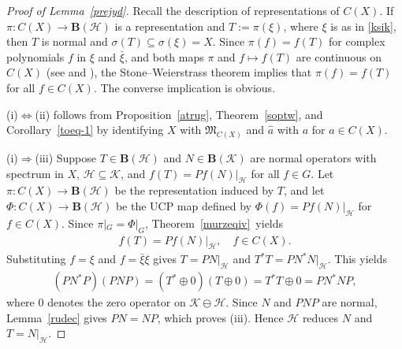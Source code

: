 \documentclass[reqno]{amsproc}
\numberwithin{equation}{section}
\theoremstyle{remark}
\newcommand*{\hh}{\mathcal{H}}
\newcommand*{\kk}{\mathcal{K}}
\theoremstyle{definition}
\newcommand*{\ogr}{\boldsymbol{B}}
\begin{document}
   \begin{proof}[Proof of Lemma~\ref{prejyd}]
Recall the description of representations of $C(X)$.
If $\pi\colon C(X) \to \ogr(\hh)$ is a representation
and $T:= \pi(\xi)$, where $\xi$ is as in \eqref{ksik},
then $T$ is normal and $\sigma(T) \subseteq
\sigma(\xi) = X$. Since $\pi(f)=f(T)$ for complex
polynomials $f$ in $\xi$ and $\bar \xi$, and both maps
$\pi$ and $f\mapsto f(T)$ are continuous on $C(X)$
(see \cite[Theorem~2.1.7]{Mur90} and
\cite[\S12.24]{Rud73}), the Stone--Weierstrass theorem
implies that $\pi(f)=f(T)$ for all $f\in C(X)$. The
converse implication is obvious.

(i)$\Leftrightarrow$(ii) follows from
Proposition~\ref{atrug}, Theorem~\ref{soptw}, and
Corollary~\ref{toeq-1} by identifying $X$ with
$\mathfrak{M}_{C(X)}$ and $\hat a$ with $a$ for $a\in
C(X)$.

(i)$\Rightarrow$(iii) Suppose $T\in \ogr(\hh)$ and
$N\in \ogr(\kk)$ are normal operators with spectrum in
$X$, $\hh\subseteq \kk$, and $f(T) = Pf(N)|_{\hh}$ for
all $f\in G$. Let $\pi\colon C(X)\to \ogr(\hh)$ be the
representation induced by $T$, and let $\varPhi\colon
C(X)\to \ogr(\hh)$ be the UCP map defined by
$\varPhi(f)= Pf(N)|_{\hh}$ for $f\in C(X)$. Since
$\pi|_G=\varPhi|_G$, Theorem~\ref{murzeqiv}~yields
   \begin{align} \label{fptry}
f(T)=Pf(N)|_{\hh}, \quad f\in C(X).
   \end{align}
Substituting $f=\xi$ and $f=\bar \xi \xi$ gives
$T=PN|_{\hh}$ and $T^*T=PN^*N|_{\hh}$. This yields
   \begin{align} \label{psptr}
(PN^*P)(PNP) = (T^*\oplus 0)(T\oplus 0) = T^*T\oplus 0
= PN^*NP,
   \end{align}
where $0$ denotes the zero operator on $\kk\ominus
\hh$. Since $N$ and $PNP$ are normal,
Lemma~\ref{rudec} gives $PN=NP$, which proves (iii).
Hence $\hh$ reduces $N$ and $T=N|_{\hh}$.


\end{proof}
\end{document}
